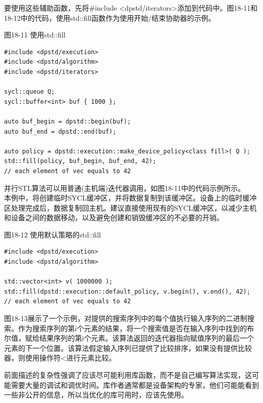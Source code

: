 要使用这些辅助函数，先将\#include <dpstd/iterators>添加到代码中。图18-11和18-12中的代码，使用std::fill函数作为使用开始/结束协助器的示例。\par

\hspace*{\fill} \par %
图18-11 使用std::fill
\begin{lstlisting}[caption={}]
#include <dpstd/execution>
#include <dpstd/algorithm>
#include <dpstd/iterators>

sycl::queue Q;
sycl::buffer<int> buf { 1000 };

auto buf_begin = dpstd::begin(buf);
auto buf_end = dpstd::end(buf);

auto policy = dpstd::execution::make_device_policy<class fill>( Q );
std::fill(policy, buf_begin, buf_end, 42);
// each element of vec equals to 42
\end{lstlisting}

\begin{tcolorbox}[colback=blue!5!white,colframe=blue!75!black, title=减少主机和设备之间的数据复制]
并行STL算法可以用普通(主机端)迭代器调用，如图18-11中的代码示例所示。\\

本例中，将创建临时SYCL缓冲区，并将数据复制到该缓冲区。设备上的临时缓冲区处理完成后，数据复制回主机。建议直接使用现有的SYCL缓冲区，以减少主机和设备之间的数据移动，以及避免创建和销毁缓冲区的不必要的开销。
\end{tcolorbox}

\hspace*{\fill} \par %
图18-12 使用默认策略的std::fill
\begin{lstlisting}[caption={}]
#include <dpstd/execution>
#include <dpstd/algorithm>

std::vector<int> v( 1000000 );
std::fill(dpstd::execution::default_policy, v.begin(), v.end(), 42);
// each element of vec equals to 42
\end{lstlisting}

图18-13展示了一个示例，对提供的搜索序列中的每个值执行输入序列的二进制搜索。作为搜索序列的第i个元素的结果，将一个搜索值是否在输入序列中找到的布尔值，赋给结果序列的第i个元素。该算法返回的迭代器指向赋值序列的最后一个元素的下一个位置。该算法假定输入序列已提供了比较排序，如果没有提供比较器，则使用操作符<进行元素比较。\par

前面描述的复杂性强调了应该尽可能利用库函数，而不是自己编写算法实现，这可能需要大量的调试和调优时间。库作者通常都是设备架构的专家，他们可能能看到一些非公开的信息，所以当优化的库可用时，应该先使用。\par

